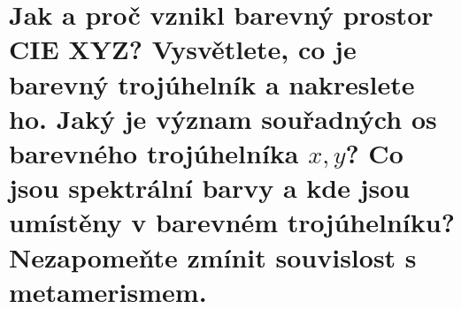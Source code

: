 \section{Jak a proč vznikl barevný prostor CIE XYZ? Vysvětlete, co je barevný trojúhelník a nakreslete ho. Jaký je 
význam souřadných os barevného trojúhelníka $x, y$? Co jsou spektrální barvy a kde jsou umístěny v barevném 
trojúhelníku? Nezapomeňte zmínit souvislost s metamerismem.}
